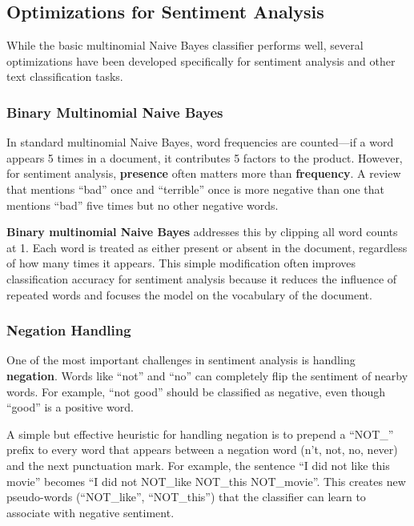 \documentclass[11pt,a4paper]{article}
\begin{document}
\subsection{Optimizations for Sentiment Analysis}

While the basic multinomial Naive Bayes classifier performs well, several optimizations have been developed specifically for sentiment analysis and other text classification tasks.

\subsubsection{Binary Multinomial Naive Bayes}

In standard multinomial Naive Bayes, word frequencies are counted---if a word appears 5 times in a document, it contributes 5 factors to the product. However, for sentiment analysis, \textbf{presence} often matters more than \textbf{frequency}. A review that mentions ``bad'' once and ``terrible'' once is more negative than one that mentions ``bad'' five times but no other negative words.

\textbf{Binary multinomial Naive Bayes} addresses this by clipping all word counts at 1. Each word is treated as either present or absent in the document, regardless of how many times it appears. This simple modification often improves classification accuracy for sentiment analysis because it reduces the influence of repeated words and focuses the model on the vocabulary of the document.

\subsubsection{Negation Handling}

One of the most important challenges in sentiment analysis is handling \textbf{negation}. Words like ``not'' and ``no'' can completely flip the sentiment of nearby words. For example, ``not good'' should be classified as negative, even though ``good'' is a positive word.

A simple but effective heuristic for handling negation is to prepend a ``NOT_'' prefix to every word that appears between a negation word (n't, not, no, never) and the next punctuation mark. For example, the sentence ``I did not like this movie'' becomes ``I did not NOT\_like NOT\_this NOT\_movie''. This creates new pseudo-words (``NOT\_like'', ``NOT\_this'') that the classifier can learn to associate with negative sentiment.
\end{document}
